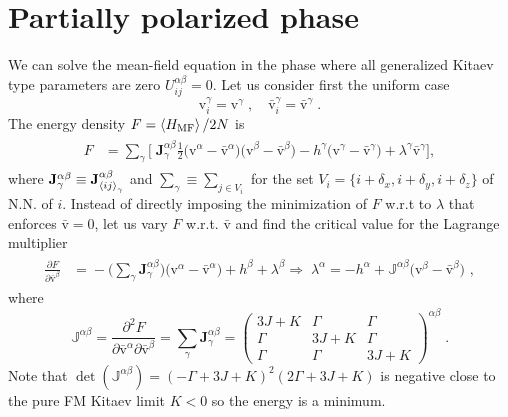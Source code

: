 \section{Partially polarized phase}
We can solve the mean-field equation in the phase where all generalized Kitaev type parameters are zero $U_{ij}^{\alpha\beta}=0$.
Let us consider first the uniform case
\begin{equation}
     \mathrm{v}^\gamma_i=\mathrm{v}^\gamma \; , \quad
     \bar{\mathrm{v}}^\gamma_i=\bar{\mathrm{v}}^\gamma \;.
\end{equation}
The energy density $F = \braket{H_{\mathrm{MF}}  }/2N$  is
\begin{align}
\begin{split}
    F     &=
   \!\sum_{\gamma}  \Big[ \; \mathbf{J}_{\gamma}^{\alpha\beta}\frac{1}{2}\big( \mathrm{v}^\alpha-\bar{\mathrm{v}}^\alpha\big)\big( \mathrm{v}^\beta-\bar{\mathrm{v}}^\beta\big)  -  h^\gamma  \big( \mathrm{v}^\gamma - \bar{\mathrm{v}}^\gamma \big)  + \lambda^\gamma \bar{\mathrm{v}}^\gamma \Big]  ,
\end{split}
\end{align}
where $\mathbf{J}_{\gamma}^{\alpha\beta} \equiv  \mathbf{J}_{\braket{ij}_\gamma}^{\alpha\beta} $ and $\sum_\gamma \equiv \sum_{j \in V_i }$ for the set $V_i=\{i+\delta_x,i+\delta_y,i+\delta_z\}$ of N.N. of $i$.
Instead of directly imposing the minimization of $F$ w.r.t to $\lambda$ that enforces $\bar{\mathrm{v}}=0$, let us vary $F$ w.r.t. $\bar{\mathrm{v}}$ and find the critical value for the Lagrange multiplier
\begin{align}
\begin{split}
    \frac{\partial F}{\partial \bar{\mathrm{v}}^\beta}      &=
   \! -\Big(\sum_{\gamma}  \mathbf{J}_{\gamma}^{\alpha\beta} \Big)\big( \mathrm{v}^\alpha-\bar{\mathrm{v}}^\alpha\big) +  h^\beta    + \lambda^\beta   \Rightarrow \boxed{\;\lambda^\alpha = -h^\alpha + \mathbb{J}^{\alpha\beta}\big( \mathrm{v}^\beta-\bar{\mathrm{v}}^\beta\big)  \, } \, ,
\end{split}
\end{align}
where
\begin{equation}
    \mathbb{J}^{\alpha\beta} = \frac{\partial^2 F}{\partial \bar{\mathrm{v}}^\alpha \partial \bar{\mathrm{v}}^\beta} =
    \sum_{\gamma}  \mathbf{J}_{\gamma}^{\alpha\beta} =
    \left(\begin{array}{ccc}
       3J + K& \Gamma & \Gamma \\
       \Gamma & 3J + K  & \Gamma \\
       \Gamma &\Gamma &3J + K
    \end{array}\right)^{\alpha\beta} \; .
\end{equation}
Note that $\det \left(\mathbb{J}^{\alpha\beta}\right) = (-\Gamma +3 J+K)^2 (2 \Gamma +3 J+K)$ is negative close to the pure FM Kitaev limit $K<0$ so the energy is a minimum.

